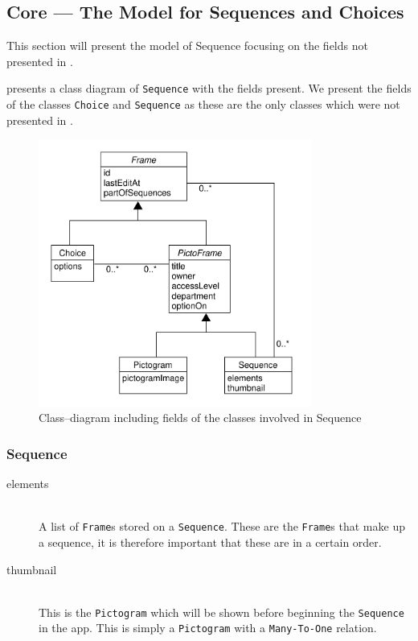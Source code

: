 \subsection{Core --- The Model for Sequences and Choices}\label{subsec:seqcore}
This section will present the model of Sequence focusing on the fields not presented in .

 presents a class diagram of \texttt{Sequence} with the fields present.
We present the fields of the classes \texttt{Choice} and \texttt{Sequence} as these are the only classes which were not presented in .

\begin{figure}[!htb]
    \centering
    \includegraphics[width=0.8\textwidth]{figures/sequencemodel.pdf}
    \caption{Class--diagram including fields of the classes involved in Sequence}\label{fig:sequencemodel}
\end{figure}

\subsubsection{Sequence}
\begin{description}
	\item[elements] \hfill \\
    A list of \texttt{Frame}s stored on a \texttt{Sequence}.
	These are the \texttt{Frame}s that make up a sequence, it is therefore important that these are in a certain order.
	\item[thumbnail] \hfill \\
    This is the \texttt{Pictogram} which will be shown before beginning the \texttt{Sequence} in the app.
	This is simply a \texttt{Pictogram} with a \texttt{Many-To-One} relation.
\end{description}


